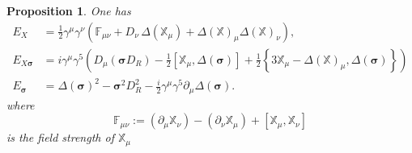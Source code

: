 \documentclass[11pt]{article}
\newcommand{\sig}{{\boldsymbol{\sigma}}}
\newcommand{\XX}{{\mathbb X}}
\newcommand{\del}{\partial}
\newtheorem{prop}{Proposition}[section]
\begin{document}
\begin{prop}
\label{Lichnedetail} One has
\begin{align}
  \label{eq:178}
  E_X &= \frac 12 \gamma^\mu\gamma^\nu\left(\mathbb{F}_{\mu\nu}
    +D_\nu\,\Delta(\XX_\mu) +
    \Delta(\XX)_\mu\Delta(\XX)_\nu\right),\\
\label{eq:178-1}
E_{X\sig}& = i\gamma^\mu\gamma^5\left( D_\mu (\sig D_R) - \frac 12[\XX_\mu, \Delta(\sig)]  +  \frac 12\left\{3\XX_\mu - \Delta(\XX)_\mu, \Delta(\sig) 
  \right\}\right)\\
\label{eq:178-2}
E_{\sig} &= \Delta(\sig)^2- \sig^2 D_R^2 - \frac
i2\gamma^\mu\gamma^5\del_\mu\Delta(\sig).
\end{align}
where
\begin{equation}
  \label{eq:176}
  {\mathbb F}_{\mu\nu}:= (\del_\mu \XX_\nu) - (\del_\nu \XX_\mu)
  +[\XX_\mu, \XX_\nu]  
\end{equation}
is the field strength of $\XX_\mu$
\end{prop}
\end{document}
